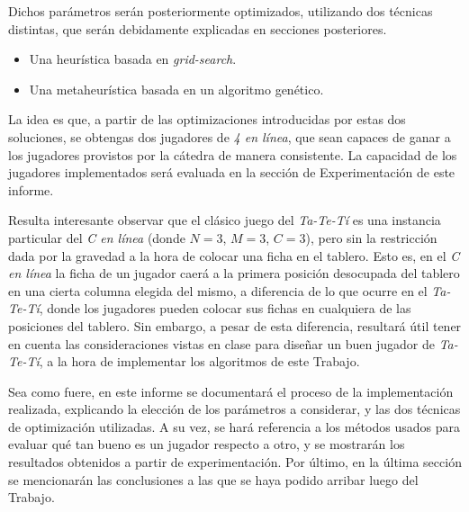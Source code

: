 \documentclass[12pt,a4paper]{article}
\begin{document}
    Dichos parámetros serán posteriormente optimizados, utilizando dos técnicas distintas, que serán debidamente explicadas en secciones posteriores.
    \begin{itemize}
        \item Una heurística basada en \textit{grid-search}.
        \item Una metaheurística basada en un algoritmo genético.
    \end{itemize}
    
    La idea es que, a partir de las optimizaciones introducidas por estas dos soluciones, se obtengas dos jugadores de \textit{4 en línea}, que sean capaces de ganar a los jugadores provistos por la cátedra de manera consistente. La capacidad de los jugadores implementados será evaluada en la sección de Experimentación de este informe.
    
    Resulta interesante observar que el clásico juego del \textit{Ta-Te-Tí} es una instancia particular del \textit{C en línea} (donde $N = 3$, $M = 3$, $C = 3$), pero sin la restricción dada por la gravedad a la hora de colocar una ficha en el tablero. Esto es, en el \textit{C en línea} la ficha de un jugador caerá a la primera posición desocupada del tablero en una cierta columna elegida del mismo, a diferencia de lo que ocurre en el \textit{Ta-Te-Tí}, donde los jugadores pueden colocar sus fichas en cualquiera de las posiciones del tablero. Sin embargo, a pesar de esta diferencia, resultará útil tener en cuenta las consideraciones vistas en clase para diseñar un buen jugador de \textit{Ta-Te-Tí}, a la hora de implementar los algoritmos de este Trabajo.
    
    Sea como fuere, en este informe se documentará el proceso de la implementación realizada, explicando la elección de los parámetros a considerar, y las dos técnicas de optimización utilizadas. A su vez, se hará referencia a los métodos usados para evaluar qué tan bueno es un jugador respecto a otro, y se mostrarán los resultados obtenidos a partir de experimentación. Por último, en la última sección se mencionarán las conclusiones a las que se haya podido arribar luego del Trabajo.
    
    
\end{document}
